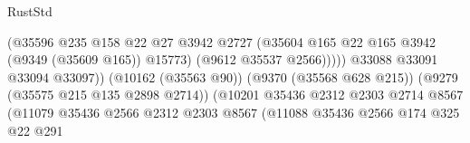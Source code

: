 \begin{lexlean}{RustStd}
\begin{coremodule}
{\begin{coremodule}
{{{{{{{{{{{{{{{{{{{{{{{{{{{{{{{{{{{{{{{                                                          (@35596
                                                            @235
                                                            @158
                                                            @22
                                                            @27
                                                            @3942
                                                            @2727
                                                            (@35604
                                                              @165
                                                              @22
                                                              @165
                                                              @3942
                                                              (@9349 (@35609 @165))
                                                              @15773)
                                                            (@9612 @35537 @2566)))))
                                                    @33088
                                                    @33091
                                                    @33094
                                                    @33097))
                                                (@10162 (@35563 @90))
                                                (@9370 (@35568 @628 @215))
                                                (@9279 (@35575 @215 @135 @2898 @2714))
                                                (@10201
                                                  @35436
                                                  @2312
                                                  @2303
                                                  @2714
                                                  @8567
                                                  (@11079
                                                    @35436
                                                    @2566
                                                    @2312
                                                    @2303
                                                    @8567
                                                    (@11088
                                                      @35436
                                                      @2566
                                                      @174
                                                      @325
                                                      @22
                                                      @291
}}}}}}}}}}}}}}}}}}}}}}}}}}}}}}}}}}}}}}}
\end{coremodule}}
\end{coremodule}
\end{lexlean}
